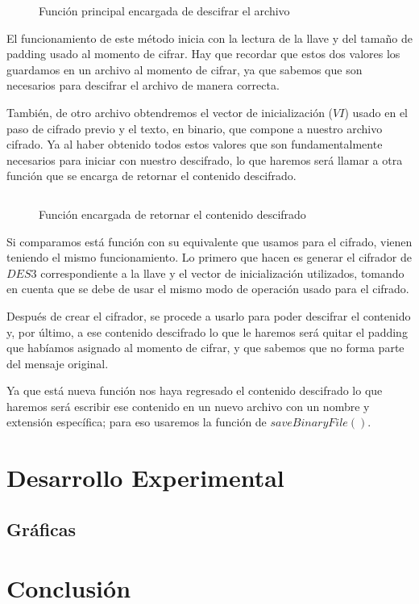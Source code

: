\documentclass[10pt]{article}
\begin{document}
   		\begin{figure}[H]
			\inputminted[linenos, firstnumber=1, breaklines, tabsize=4, firstline=128, lastline=140]{python}{code/App.py}
			\caption{Función principal encargada de descifrar el archivo}
		\end{figure}

		El funcionamiento de este método inicia con la lectura de la llave y del tamaño de padding usado al momento de cifrar. Hay que recordar que estos dos valores los guardamos en un archivo al momento de cifrar, ya que sabemos que son necesarios para descifrar el archivo de manera correcta. 

		También, de otro archivo obtendremos el vector de inicialización ($VI$) usado en el paso de cifrado previo y el texto, en binario, que compone a nuestro archivo cifrado. Ya al haber obtenido todos estos valores que son fundamentalmente necesarios para iniciar con nuestro descifrado, lo que haremos será llamar a otra función que se encarga de retornar el contenido descifrado.

		\begin{figure}[H]
			\inputminted[linenos, firstnumber=1, breaklines, tabsize=4, firstline=154, lastline=158 ]{python}{code/App.py}
			\caption{Función encargada de retornar el contenido descifrado}
		\end{figure}

		Si comparamos está función con su equivalente que usamos para el cifrado, vienen teniendo el mismo funcionamiento. Lo primero que hacen es generar el cifrador de $DES3$ correspondiente a la llave y el vector de inicialización utilizados, tomando en cuenta que se debe de usar el mismo modo de operación usado para el cifrado. 

		Después de crear el cifrador, se procede a usarlo para poder descifrar el contenido y, por último, a ese contenido descifrado lo que le haremos será quitar el padding que habíamos asignado al momento de cifrar, y que sabemos que no forma parte del mensaje original.

		Ya que está nueva función nos haya regresado el contenido descifrado lo que haremos será escribir ese contenido en un nuevo archivo con un nombre y extensión específica; para eso usaremos la función de $saveBinaryFile()$.


\section{Desarrollo Experimental}
	\subsection{Gráficas}
\section{Conclusión}


 
 
\end{document}
